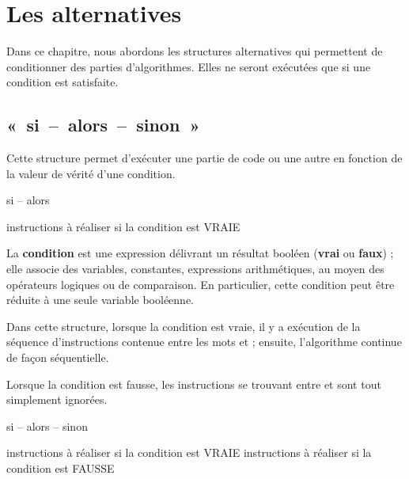 \chapter{Les alternatives}

Dans ce chapitre, nous abordons les structures alternatives qui
permettent de conditionner des parties d’algorithmes.
Elles ne seront exécutées que si une condition est satisfaite.

\section{«~si~–~alors~–~sinon~»}

	Cette structure permet d’exécuter une partie de code ou
	une autre en fonction de la valeur de vérité d’une condition.
	
	\begin{Emphase}[definition]{si – alors}
	\begin{Pseudocode}
		\LComment instructions à réaliser si la condition est VRAIE
	\EndIf
	\end{Pseudocode}
	\end{Emphase}
	
	La \textbf{condition} est une expression délivrant un résultat booléen
	(\textbf{vrai} ou \textbf{faux}) ; 
	elle associe des variables, constantes, expressions arithmétiques, 
	au moyen des opérateurs logiques ou de comparaison. 
	En particulier, cette condition peut être réduite à
	une seule variable booléenne.
	
	Dans cette structure, lorsque la condition est vraie,
	il y a exécution de la séquence d’instructions contenue 
	entre les mots  et  ; 
	ensuite, l’algorithme continue de façon séquentielle.
	
	Lorsque la condition est fausse, les instructions se trouvant entre 
	 et \pseudocode{\K{fin si}} 
	sont tout simplement ignorées.
	
	\begin{Emphase}[definition]{si – alors – sinon}
		\begin{Pseudocode}
		\If{condition}
			\LComment instructions à réaliser si la condition est VRAIE
		\Else
			\LComment instructions à réaliser si la condition est FAUSSE
		\EndIf
		\end{Pseudocode}
	\end{Emphase}
	
